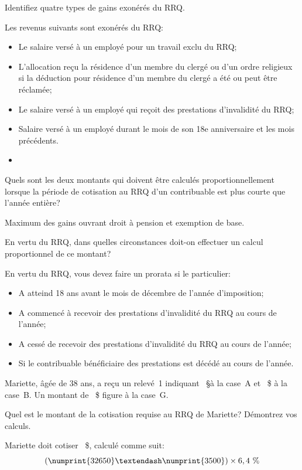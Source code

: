 \begin{question}
	Identifiez quatre types de gains exonérés du RRQ.
\end{question}
Les revenus suivants sont exonérés du RRQ:
\begin{itemize}
	\item Le salaire versé à un employé pour un travail exclu du RRQ;
	\item L'allocation reçu la résidence d'un membre du clergé ou d'un ordre religieux si la déduction pour résidence d'un membre du clergé a été ou peut être réclamée;
	\item Le salaire versé à un employé qui reçoit des prestations d'invalidité du RRQ; 
	\item Salaire versé à un employé durant le mois de son 18e anniversaire et les mois précédents.
	\item 
\end{itemize}

\begin{question}
	Quels sont les deux montants qui doivent être calculés proportionnellement lorsque la période de cotisation au RRQ d'un contribuable est plus courte que l'année entière?
\end{question}
Maximum des gains ouvrant droit à pension et exemption de base.

\begin{question}
	En vertu du RRQ, dans quelles circonstances doit-on effectuer un calcul proportionnel de ce montant? 
\end{question}
En vertu du RRQ, vous devez faire un prorata si le particulier:
\begin{itemize}
	\item A atteind 18 ans avant le mois de décembre de l'année d'imposition;
	\item A commencé à recevoir des prestations d'invalidité du RRQ au cours de l'année;
	\item A cessé de recevoir des prestations d'invalidité du RRQ au cours de l'année; 
	\item Si le contribuable bénéficiaire des prestations est décédé au cours de l'année.
\end{itemize}

\begin{question}
	Mariette, âgée de 38 ans, a reçu un relevé~1 indiquant ~\S à la case~A et ~\$ à la case~B. Un montant de ~\$ figure à la case~G.
\end{question}
\setcounter{sousQuestion}{0}
\begin{sousQuestion}
	Quel est le montant de la cotisation requise au RRQ de Mariette? Démontrez vos calculs.
\end{sousQuestion}
Mariette doit cotiser ~\$, calculé comme suit:
\[ (\numprint{32650} – \numprint{3 500}) \times 6,4~\% \]

